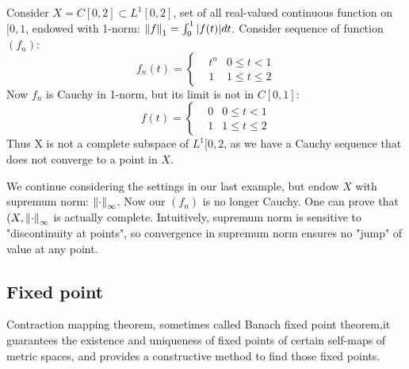 \begin{example}\rm\nextline
	\placeholder
\end{example}

\begin{example}\rm\nextline
	Consider $X=C[0,2]\subset L^1 [0,2]$, set of all real-valued continuous function on $[0,1$, endowed with 1-norm: $\left\|{f}\right\|_1=\int_0^1|f(t)|dt$. Consider sequence of function $(f_n)$:
	\begin{equation}
		f_n(t)=\left\{
		\begin{aligned}\nonumber
			 & t^n & 0\leq t<1     \\
			 & 1   & 1\leq t\leq 2
		\end{aligned}
		\right.
	\end{equation}
	Now $f_n$ is Cauchy in 1-norm, but its limit is not in $C[0,1]$:
	\begin{equation}
		f(t)=\left\{
		\begin{aligned}\nonumber
			 & 0 & 0\leq t<1     \\
			 & 1 & 1\leq t\leq 2
		\end{aligned}
		\right.
	\end{equation}
	Thus X is not a complete subspace of $L^1[0,2$, as we have a Cauchy sequence that does not converge to a point in $X$.
\end{example}

\begin{example}\rm\nextline
	We continue considering the settings in our last example, but endow $X$ with supremum norm: $\left\|{\cdot}\right\|_\infty$. Now our $(f_n)$ is no longer Cauchy. One can prove that $(X,\left\|{\cdot}\right\|_\infty$ is actually complete. Intuitively, supremum norm is sensitive to "discontinuity at points", so convergence in supremum norm ensures no "jump" of value at any point.
\end{example}
\newpage

\newpage
\subsection{Fixed point}
Contraction mapping theorem, sometimes called Banach fixed point theorem,it guarantees the existence and uniqueness of fixed points of certain self-maps of metric spaces, and provides a constructive method to find those fixed points.

